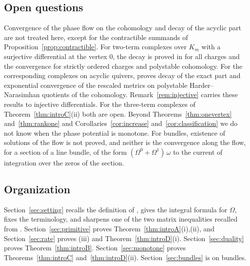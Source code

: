 \subsection{Open questions}
Convergence of the phase flow on the cohomology and decay of the acyclic
part are not treated here, except for the contractible summands of
Proposition~\ref{prop:contractible}. For two-term complexes over $K_m$ with
a surjective differential at the vertex $0$, the decay is proved in
\cite{wue26b} for all charges and the convergence for strictly ordered
charges and polystable cohomology. For the corresponding complexes on
acyclic quivers, \cite{wue26c} proves decay of the exact part and
exponential convergence of the rescaled metrics on polystable
Harder--Narasimhan quotients of the cohomology.
Remark~\ref{rem:injective} carries these results to injective differentials. For the
three-term complexes of Theorem~\ref{thm:introC}(ii) both are open. Beyond
Theorems~\ref{thm:onevertex} and~\ref{thm:rankone} and
Corollaries~\ref{cor:increase} and~\ref{cor:classification} we do not know
when the phase potential is monotone. For bundles, existence of solutions of
the flow is not proved, and neither is the convergence along the flow, for a
section of a line bundle, of the form $(\Omega^0+\Omega^1)\,\omega$ to the
current of integration over the zeros of the section.

\subsection{Organization}
Section~\ref{sec:setting} recalls the definition of \cite{hkkp26}, gives the
integral formula for $\Omega$, fixes the terminology, and sharpens one of the two
matrix inequalities recalled from \cite{wue26b}. Section~\ref{sec:primitive}
proves Theorem~\ref{thm:introA}(i),(ii), and Section~\ref{sec:rate} proves
(iii) and Theorem~\ref{thm:introD}(i). Section~\ref{sec:duality} proves
Theorem~\ref{thm:introB}. Section~\ref{sec:monotone} proves
Theorems~\ref{thm:introC} and~\ref{thm:introD}(ii).
Section~\ref{sec:bundles} is on bundles.
